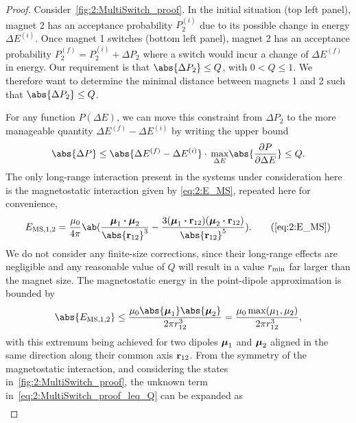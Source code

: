 \begin{proof}
	Consider~\cref{fig:2:MultiSwitch_proof}.
	In the initial situation (top left panel), magnet 2 has an acceptance probability $P_2^{(i)}$ due to its possible change in energy $\Delta E^{(i)}$.
	Once magnet 1 switches (bottom left panel), magnet 2 has an acceptance probability $P_2^{(f)} = P_2^{(i)} + \Delta P_2$ where a switch would incur a change of $\Delta E^{(f)}$ in energy.
	Our requirement is that $\abs{\Delta P_2} \leq Q$, with $0 < Q \leq 1$.
	We therefore want to determine the minimal distance between magnets 1 and 2 such that $\abs{\Delta P_2} \leq Q$. \par
	For any function $P(\Delta E)$, we can move this constraint from $\Delta P_2$ to the more manageable quantity $\Delta E^{(f)} - \Delta E^{(i)}$ by writing the upper bound
	\begin{equation}
		\abs{\Delta P} \leq \abs{\Delta E^{(f)} - \Delta E^{(i)}} \cdot \, \underset{\Delta E}{\max} \abs{\frac{\partial P}{\partial \Delta E}} \leq Q \mathrm{.}
		\label{eq:2:MultiSwitch_proof_leq_Q}
	\end{equation}
	The only long-range interaction present in the systems under consideration here is the magnetostatic interaction given by \eqref{eq:2:E_MS}, repeated here for convenience,
	\begin{equation*}
		E_{\mathrm{MS},1,2} = \frac{\mu_0}{4 \pi} \ab(\frac{\vc{\mu}_1 \bcdot \vc{\mu}_2}{\abs{\vc{r}_{12}}^3} - \frac{3(\vc{\mu}_1 \bcdot \vc{r}_{12}) (\vc{\mu}_2 \bcdot \vc{r}_{12})}{\abs{\vc{r}_{12}}^5}) \mathrm{.}  \tag{\ref*{eq:2:E_MS}}
	\end{equation*}
	We do not consider any finite-size corrections, since their long-range effects are negligible and any reasonable value of $Q$ will result in a value $r_\mathrm{min}$ far larger than the magnet size.
	The magnetostatic energy in the point-dipole approximation is bounded by
	\begin{equation}
		\abs{E_{\mathrm{MS},1,2}} \leq \frac{\mu_0 \abs{\vc{\mu}_1} \abs{\vc{\mu}_2}}{2 \pi r_{12}^3} = \frac{\mu_0 \max(\mu_1, \mu_2)}{2 \pi r_{12}^3} \mathrm{,}
		\label{eq:2:MultiSwitch_proof_EMS_leq}
	\end{equation}
	with this extremum being achieved for two dipoles $\boldsymbol{\mathbf{\mu}}_1$ and $\boldsymbol{\mathbf{\mu}}_2$ aligned in the same direction along their common axis $\boldsymbol{\mathbf{r}}_{12}$.
	From the symmetry of the magnetostatic interaction, and considering the states in~\cref{fig:2:MultiSwitch_proof}, the unknown term in~\cref{eq:2:MultiSwitch_proof_leq_Q} can be expanded as 
	\begin{align*}

\end{align*}
\end{proof}
